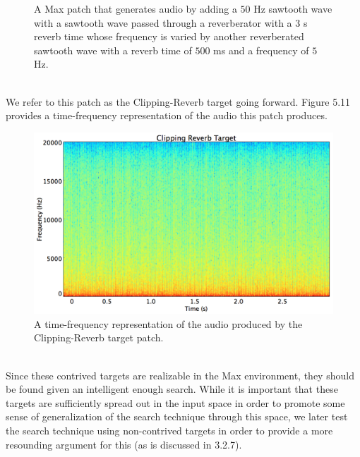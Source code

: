 \documentclass[a4paper,12pt]{report} 	%
\numberwithin{figure}{chapter}
\numberwithin{table}{chapter}
\numberwithin{equation}{chapter}
\begin{document}
\begin{flushleft}
\begin{figure}[h!]
\begin{center}
\caption[Clipping Reverb Sawtooth Max Patch]{A Max patch that generates audio by adding a $50$ Hz sawtooth wave with a sawtooth wave passed through a reverberator with a $3$ s reverb time whose frequency is varied by another reverberated sawtooth wave with a reverb time of $500$ ms and a frequency of $5$ Hz.}
\end{center}
\end{figure}
\\
We refer to this patch as the Clipping-Reverb target going forward. Figure 5.11 provides a time-frequency representation of the audio this patch produces.
\\
\begin{figure}[h!]
\begin{center}
\includegraphics[scale=0.35,width=\linewidth]{ClippingReverbTargetSTFT}
\caption[Clipping Reverb Sawtooth Time-Frequency Representation]{A time-frequency representation of the audio produced by the Clipping-Reverb target patch.}
\end{center}
\end{figure}
\\
Since these contrived targets are realizable in the Max environment, they should be found given an intelligent enough search. While it is important that these targets are sufficiently spread out in the input space in order to promote some sense of generalization of the search technique through this space, we later test the search technique using non-contrived targets in order to provide a more resounding argument for this (as is discussed in 3.2.7).


\end{flushleft}
\end{document}
